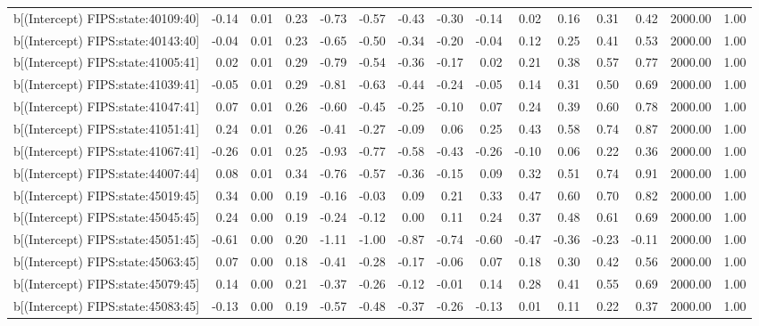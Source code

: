 \begin{table}[ht]
\begin{tabular}{rrrrrrrrrrrrrrr}
  b[(Intercept) FIPS:state:40109:40] & -0.14 & 0.01 & 0.23 & -0.73 & -0.57 & -0.43 & -0.30 & -0.14 & 0.02 & 0.16 & 0.31 & 0.42 & 2000.00 & 1.00 \\ 
  b[(Intercept) FIPS:state:40143:40] & -0.04 & 0.01 & 0.23 & -0.65 & -0.50 & -0.34 & -0.20 & -0.04 & 0.12 & 0.25 & 0.41 & 0.53 & 2000.00 & 1.00 \\ 
  b[(Intercept) FIPS:state:41005:41] & 0.02 & 0.01 & 0.29 & -0.79 & -0.54 & -0.36 & -0.17 & 0.02 & 0.21 & 0.38 & 0.57 & 0.77 & 2000.00 & 1.00 \\ 
  b[(Intercept) FIPS:state:41039:41] & -0.05 & 0.01 & 0.29 & -0.81 & -0.63 & -0.44 & -0.24 & -0.05 & 0.14 & 0.31 & 0.50 & 0.69 & 2000.00 & 1.00 \\ 
  b[(Intercept) FIPS:state:41047:41] & 0.07 & 0.01 & 0.26 & -0.60 & -0.45 & -0.25 & -0.10 & 0.07 & 0.24 & 0.39 & 0.60 & 0.78 & 2000.00 & 1.00 \\ 
  b[(Intercept) FIPS:state:41051:41] & 0.24 & 0.01 & 0.26 & -0.41 & -0.27 & -0.09 & 0.06 & 0.25 & 0.43 & 0.58 & 0.74 & 0.87 & 2000.00 & 1.00 \\ 
  b[(Intercept) FIPS:state:41067:41] & -0.26 & 0.01 & 0.25 & -0.93 & -0.77 & -0.58 & -0.43 & -0.26 & -0.10 & 0.06 & 0.22 & 0.36 & 2000.00 & 1.00 \\ 
  b[(Intercept) FIPS:state:44007:44] & 0.08 & 0.01 & 0.34 & -0.76 & -0.57 & -0.36 & -0.15 & 0.09 & 0.32 & 0.51 & 0.74 & 0.91 & 2000.00 & 1.00 \\ 
  b[(Intercept) FIPS:state:45019:45] & 0.34 & 0.00 & 0.19 & -0.16 & -0.03 & 0.09 & 0.21 & 0.33 & 0.47 & 0.60 & 0.70 & 0.82 & 2000.00 & 1.00 \\ 
  b[(Intercept) FIPS:state:45045:45] & 0.24 & 0.00 & 0.19 & -0.24 & -0.12 & 0.00 & 0.11 & 0.24 & 0.37 & 0.48 & 0.61 & 0.69 & 2000.00 & 1.00 \\ 
  b[(Intercept) FIPS:state:45051:45] & -0.61 & 0.00 & 0.20 & -1.11 & -1.00 & -0.87 & -0.74 & -0.60 & -0.47 & -0.36 & -0.23 & -0.11 & 2000.00 & 1.00 \\ 
  b[(Intercept) FIPS:state:45063:45] & 0.07 & 0.00 & 0.18 & -0.41 & -0.28 & -0.17 & -0.06 & 0.07 & 0.18 & 0.30 & 0.42 & 0.56 & 2000.00 & 1.00 \\ 
  b[(Intercept) FIPS:state:45079:45] & 0.14 & 0.00 & 0.21 & -0.37 & -0.26 & -0.12 & -0.01 & 0.14 & 0.28 & 0.41 & 0.55 & 0.69 & 2000.00 & 1.00 \\ 
  b[(Intercept) FIPS:state:45083:45] & -0.13 & 0.00 & 0.19 & -0.57 & -0.48 & -0.37 & -0.26 & -0.13 & 0.01 & 0.11 & 0.22 & 0.37 & 2000.00 & 1.00 \\ 

\end{tabular}
\end{table}
